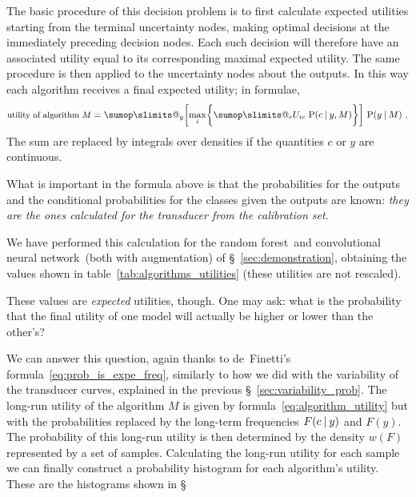 \documentclass[\ifafour a4paper,12pt,\else a5paper,10pt,\fi%
onecolumn,oneside,article,%
british%
]{memoir}
\makeatletter
\theoremstyle{remark}
\theoremstyle{innote}
\def\sum{\DOTSI\sumop\slimits@}
\newcommand*{\wrench}{{\fontencoding{U}\fontfamily{fontawesomethree}\selectfont\symbol{114}}}
\newcommand{\mynotew}[1]{{\footnotesize\color{notecolour}\wrench\ #1}}
\DeclarePairedDelimiter\set{\{}{\}} %
\renewcommand*{\P}{\mathrm{P}}%
\renewcommand*{\|}[1][]{\nonscript\:#1\vert\nonscript\:\mathopen{}}
\newcommand*{\sect}{\S}%
\newcommand*{\wf}{w}
\newcommand*{\texts}[1]{\text{\small #1}}
\newcommand*{\RF}{random forest}
\newcommand*{\CNN}{convolutional neural network}
\makeatother
\begin{document}
The basic procedure of this decision problem is to first calculate expected utilities starting from the terminal uncertainty nodes, making optimal decisions at the immediately preceding decision nodes. Each such decision will therefore have an associated utility equal to its corresponding maximal expected utility. The same procedure is then applied to the uncertainty nodes about the outputs. In this way each algorithm receives a final expected utility; in formulae,
\begin{equation}
  \label{eq:algorithm_utility}
\texts{utility of algorithm $M$} =  \sum_{y} \biggl[\max_{i}\set[\bigg]{\sum_{c} U_{ic}\ \P(c \| y, M)}\biggr]\
  \P(y \| M) \ .
\end{equation}
The sum are replaced by integrals over densities if the quantities $c$ or $y$ are continuous.

What is important in the formula above is that the probabilities for the outputs and the conditional probabilities for the classes given the outputs are known: \emph{they are the ones calculated for the transducer from the calibration set}.

We have performed this calculation for the \RF\ and \CNN\ (both with augmentation) of \sect~\ref{sec:demonstration}, obtaining the values shown in table~\ref{tab:algorithms_utilities} (these utilities are not rescaled).


\medskip

These values are \emph{expected} utilities, though. One may ask: what is the probability that the final utility of one model will actually be higher or lower than the other's?

We can answer this question, again thanks to de~Finetti's formula~\eqref{eq:prob_is_expe_freq}, similarly to how we did with the variability of the transducer curves, explained in the previous \sect~\ref{sec:variability_prob}. The long-run utility of the algorithm $M$ is given by formula~\eqref{eq:algorithm_utility} but with the probabilities replaced by the long-term frequencies $F(c\|y)$ and $F(y)$. The probability of this long-run utility is then determined by the density $\wf(F)$ represented by a set of samples. Calculating the long-run utility for each sample we can finally construct a probability histogram for each algorithm's utility. These are the histograms shown in \sect\mynotew{}
\end{document}
